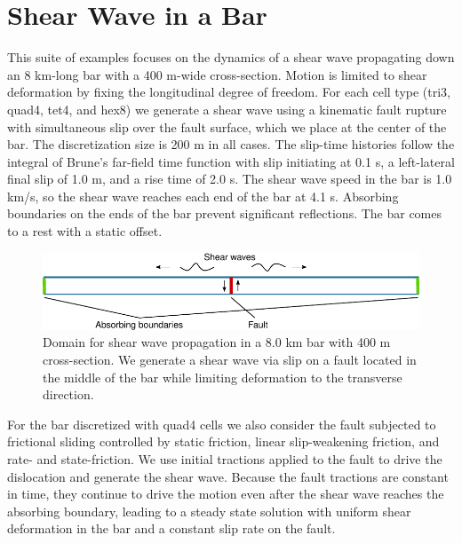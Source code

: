 
\section{Shear Wave in a Bar}

This suite of examples focuses on the dynamics of a shear wave propagating
down an 8 km-long bar with a 400 m-wide cross-section. Motion is limited
to shear deformation by fixing the longitudinal degree of freedom.
For each cell type (tri3, quad4, tet4, and hex8) we generate a shear
wave using a kinematic fault rupture with simultaneous slip over the
fault surface, which we place at the center of the bar. The discretization
size is 200 m in all cases. The slip-time histories follow the integral
of Brune's far-field time function with slip initiating at 0.1 s,
a left-lateral final slip of 1.0 m, and a rise time of 2.0 s. The
shear wave speed in the bar is 1.0 km/s, so the shear wave reaches
each end of the bar at 4.1 s. Absorbing boundaries on the ends of
the bar prevent significant reflections. The bar comes to a rest with
a static offset.

\begin{figure}
\begin{centering}
\includegraphics{tutorials/shearwave/figs/bar}
\par\end{centering}

\caption{Domain for shear wave propagation in a 8.0 km bar with 400 m cross-section.
We generate a shear wave via slip on a fault located in the middle
of the bar while limiting deformation to the transverse direction.\label{fig:shearwave:domain}}
\end{figure}


For the bar discretized with quad4 cells we also consider the fault
subjected to frictional sliding controlled by static friction, linear
slip-weakening friction, and rate- and state-friction. We use initial
tractions applied to the fault to drive the dislocation and generate
the shear wave. Because the fault tractions are constant in time,
they continue to drive the motion even after the shear wave reaches
the absorbing boundary, leading to a steady state solution with uniform
shear deformation in the bar and a constant slip rate on the fault. 


